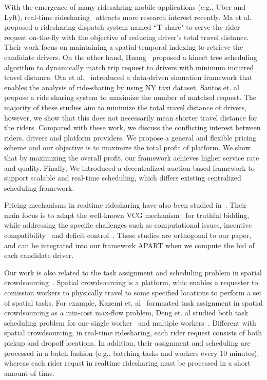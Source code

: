 With the emergence of many ridesahring mobile applications (e.g., Uber and Lyft), real-time ridesharing~\cite{Ma13, Ma15, Huang14,OtaBigdata15, CiciGis15, CaoMDM15, PelzerITS15} attracts more research interest recently. Ma et al.~\cite{Ma13, Ma15} proposed a ridesharing dispatch system named ``T-share" to serve the rider request on-the-fly with the objective of reducing driver's total travel distance. Their work focus on maintaining a spatial-temporal indexing to retrieve the candidate drivers. On the other hand, Huang~\cite{Huang14} proposed a kinect tree scheduling algorithm to dynamically match trip request to drivers with minimum incurred travel distance. Ota et al.~\cite{OtaBigdata15} introduced a data-driven simuation framework that enables the analysis of ride-sharing by using NY taxi dataset. Santos et. al~\cite{SantosIjcai13} propose a ride sharing system to maximize the number of matched request. The majority of these studies aim to minimize the total travel distance of drivers, however, we show that this does not necessarily mean shorter travel distance for the riders. Compared with these work, we discuss the conflicting interest between riders, drivers and platform providers. We propose a general and flexible pricing scheme and  our objective is to maximize the total profit of platform. We show that by maximizing the overall profit, our framework achieves higher service rate and quality.  Finally, We introduced a decentralized auction-based framework to support scalable and real-time scheduling, which differs existing centralized scheduling framework. 

Pricing mechanisms in realtime ridesharing have also been studied in~\cite{KamarIJCAI09,KleinerIJCAI11, ZhaoAAMAS14}. Their main focus is to adapt the well-known VCG mechanism~\cite{Nisan07} for truthful bidding, while addressing the specific challenges such as computational issues, incentive compatibility~\cite{KamarIJCAI09, KleinerIJCAI11} and deficit control~\cite{ZhaoAAMAS14}. These studies are orthogonal to our paper, and can be integrated into our framework APART when we compute the bid of each candidate driver. 

Our work is also related to the task assignment and scheduling problem in spatial crowdsourcing~\cite{KazemiGis12, DengGis13, DengGis15}. Spatial crowdsourcing is a platform, whic enables a requester to comission workers to physically travel to some specified locations to perform a set of spatial tasks. For example, Kazemi et. al~\cite{KazemiGis12} formuated task assignment in spatial crowdsourcing as a min-cost max-flow problem, Deng et. al studied both task scheduling problem for one single worker~\cite{DengGis13} and multiple workers~\cite{DengGis15}. Different with spatial crowdsourcing, in real-time ridesharing, each rider request consists of both pickup and dropoff locations. In addition, their assignment and scheduling are processed in a batch fashion (e.g., batching tasks and workers every 10 minutes), whereas each rider requst in realtime ridesharing must be processed in a short amount of time.
